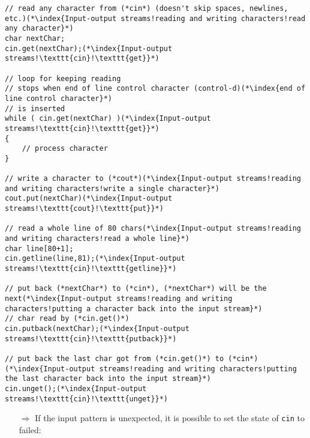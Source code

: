 \documentclass[10pt]{article}
\begin{document}
\begin{lstlisting}
// read any character from (*cin*) (doesn't skip spaces, newlines, etc.)(*\index{Input-output streams!reading and writing characters!read any character}*)
char nextChar;
cin.get(nextChar);(*\index{Input-output streams!\texttt{cin}!\texttt{get}}*)

// loop for keeping reading
// stops when end of line control character (control-d)(*\index{end of line control character}*)
// is inserted
while ( cin.get(nextChar) )(*\index{Input-output streams!\texttt{cin}!\texttt{get}}*)
{
    // process character
}

// write a character to (*cout*)(*\index{Input-output streams!reading and writing characters!write a single character}*)
cout.put(nextChar)(*\index{Input-output streams!\texttt{cout}!\texttt{put}}*)

// read a whole line of 80 chars(*\index{Input-output streams!reading and writing characters!read a whole line}*)
char line[80+1];
cin.getline(line,81);(*\index{Input-output streams!\texttt{cin}!\texttt{getline}}*)

// put back (*nextChar*) to (*cin*), (*nextChar*) will be the next(*\index{Input-output streams!reading and writing characters!putting a character back into the input stream}*)
// char read by (*cin.get()*)
cin.putback(nextChar);(*\index{Input-output streams!\texttt{cin}!\texttt{putback}}*)

// put back the last char got from (*cin.get()*) to (*cin*)(*\index{Input-output streams!reading and writing characters!putting the last character back into the input stream}*)
cin.unget();(*\index{Input-output streams!\texttt{cin}!\texttt{unget}}*)
\end{lstlisting}
\begin{enumerate}
\item[$\Rightarrow$] If the input pattern is unexpected, it is possible to set the state of \texttt{cin} to failed:
\end{enumerate}
\end{document}
